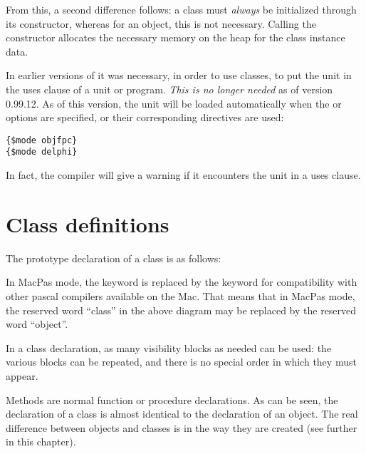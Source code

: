 From this, a second difference follows: a class must {\em always} be initialized
through its constructor, whereas for an object, this is not necessary.
Calling the constructor allocates the necessary memory on the heap for the
class instance data.

\begin{remark}
In earlier versions of \fpc it was necessary, in order to use classes,
to put the  unit in the uses clause of a unit or program.
{\em This is no longer needed} as of version 0.99.12. As of this version,
the unit will be loaded automatically when the  or
  options are specified, or their corresponding directives are
used:
\begin{verbatim}
{$mode objfpc}
{$mode delphi}
\end{verbatim}
In fact, the compiler will give a warning if it encounters the
 unit in a uses clause.
\end{remark}

\section{Class definitions}
The prototype declaration of a class is as follows:


\begin{remark}
In MacPas mode, the  keyword is replaced by the 
keyword for compatibility with other pascal compilers available on the Mac.
That means that in MacPas mode, the reserved word ``class'' in the above
diagram may be replaced by the reserved word ``object''.
\end{remark}

In a class declaration, as many visibility blocks as needed can be used:
the various blocks can be repeated, and there is no special order in
which they must appear.

Methods are normal function or procedure declarations.
As can be seen, the declaration of a class is almost identical to the
declaration of an object. The real difference between objects and classes
is in the way they are created (see further in this chapter).

